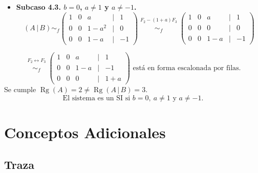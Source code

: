 \documentclass[a4paper,12pt]{article}
\begin{document}
\begin{ejercicio}[title=Ejercicio 31]
\begin{itemize}
\begin{itemize}
\item \textbf{Subcaso 4.3. \(b=0\), \(a\neq 1\) y \(a\neq -1\).}
\[
(A\,|\,B)\sim_f
\begin{pmatrix}
1 & 0 & a &\Big|& 1\\
0 & 0 & 1-a^2 &\Big|& 0\\
0 & 0 & 1-a &\Big|& -1
\end{pmatrix}
\overset{\substack{F_2-(1+a)F_3\\{}}}{\sim_f}
\begin{pmatrix}
1 & 0 & a &\Big|& 1\\
0 & 0 & 0 &\Big|& 0\\
0 & 0 & 1-a &\Big|& -1
\end{pmatrix}
\]
\end{itemize}
\end{itemize}
\end{ejercicio}
\begin{ejercicio}[title=Ejercicio 31]
\begin{itemize}
\begin{itemize}
\[
\overset{\substack{F_2\leftrightarrow F_3\\{}}}{\sim_f}
\begin{pmatrix}
1 & 0 & a &\Big|& 1\\
0 & 0 & 1-a &\Big|& -1\\
0 & 0 & 0 &\Big|& 1+a
\end{pmatrix}
\text{ está en forma escalonada por filas.}
\]
Se cumple \(\operatorname{Rg}(A)=2 \neq \operatorname{Rg}(A\,|\,B)=3\).  
\[
\boxed{\text{El sistema es un SI si } b=0,\ a\neq 1 \text{ y } a\neq -1.}
\]
\end{itemize}
\end{itemize}
\end{ejercicio}

\section{Conceptos Adicionales}

\subsection{Traza}
\end{document}
